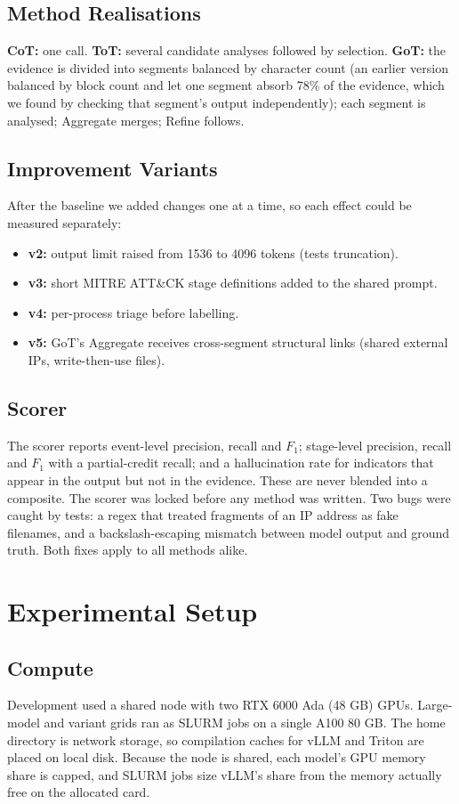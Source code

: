 \documentclass[a4paper, 12pt]{report}
\theoremstyle{definition}
\begin{document}
\section{Method Realisations}
\textbf{CoT:} one call. \textbf{ToT:} several candidate analyses followed by selection. \textbf{GoT:} the evidence is divided into segments balanced by character count (an earlier version balanced by block count and let one segment absorb 78\% of the evidence, which we found by checking that segment's output independently); each segment is analysed; Aggregate merges; Refine follows.

\section{Improvement Variants}
After the baseline we added changes one at a time, so each effect could be measured separately:
\begin{itemize}
	\item \textbf{v2:} output limit raised from 1536 to 4096 tokens (tests truncation).
	\item \textbf{v3:} short MITRE ATT\&CK stage definitions added to the shared prompt.
	\item \textbf{v4:} per-process triage before labelling.
	\item \textbf{v5:} GoT's Aggregate receives cross-segment structural links (shared external IPs, write-then-use files).
\end{itemize}

\section{Scorer}
The scorer reports event-level precision, recall and $F_1$; stage-level precision, recall and $F_1$ with a partial-credit recall; and a hallucination rate for indicators that appear in the output but not in the evidence. These are never blended into a composite. The scorer was locked before any method was written. Two bugs were caught by tests: a regex that treated fragments of an IP address as fake filenames, and a backslash-escaping mismatch between model output and ground truth. Both fixes apply to all methods alike.

\chapter{Experimental Setup}
\label{chap.5}
\section{Compute}
Development used a shared node with two RTX 6000 Ada (48 GB) GPUs. Large-model and variant grids ran as SLURM jobs on a single A100 80 GB. The home directory is network storage, so compilation caches for vLLM and Triton are placed on local disk. Because the node is shared, each model's GPU memory share is capped, and SLURM jobs size vLLM's share from the memory actually free on the allocated card.
\end{document}
